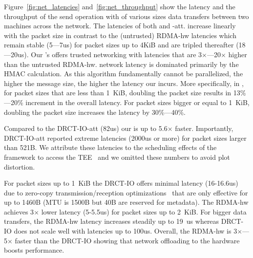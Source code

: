 Figure~\ref{fig:net_latencies} and~\ref{fig:net_throughput} show the latency and the throughput of the send operation with of various sizes data transfers between two machines across the network. The latencies of both \projecttitle{} and \projecttitle{}-att. increase linearly with the packet size in contrast to the (untrusted) RDMA-hw latencies which remain stable (5---7us) for packet sizes up to 4KiB and are tripled thereafter (18---20us). Our \projecttitle{}'s offers trusted networking with latencies that are 3$\times$---20$\times$ higher than the untrusted RDMA-hw. \projecttitle{} network latency is dominated primarily by the HMAC calculation. As this algorithm fundamentally cannot be parallelized, the higher the message size, the higher the latency our \projecttitle{} incurs. More specifically, in \projecttitle{}, for packet sizes that are less than 1~KiB, doubling the packet size results in 13\%---20\% increment in the overall latency. For packet sizes bigger or equal to 1~KiB, doubling the packet size increases the latency by 30\%---40\%. 

Compared to the DRCT-IO-att (82us) our \projecttitle{} is up to 5.6$\times$ faster. Importantly, DRCT-IO-att reported extreme latencies (2000us or more) for packet sizes larger than 521B. We attribute these latencies to the scheduling effects of the framework to access the TEE~\cite{scone} and we omitted these numbers to avoid plot distortion. 

For packet sizes up to 1~KiB the DRCT-IO offers minimal latency (16-16.6us) due to zero-copy transmission/reception optimizations~\cite{erpc} that are only effective for up to 1460B (MTU is 1500B but 40B are reserved for metadata).  The RDMA-hw achieves 3$\times$ lower latency (5-5.5us) for packet sizes up to 2~KiB. For bigger data transfers, the RDMA-hw latency increases steadily up to 19~us whereas DRCT-IO does not scale well with latencies up to 100us.  Overall, the RDMA-hw is 3$\times$---5$\times$ faster than the DRCT-IO showing that network offloading to the hardware boosts performance.



